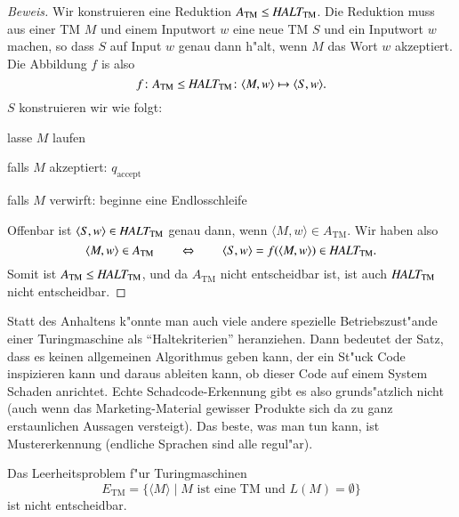\begin{proof}[Beweis]
Wir konstruieren eine Reduktion
$
A_{\text{TM}}
\le
\text{\it HALT}_{\text{TM}}
$.
Die Reduktion muss aus einer TM $M$ und einem Inputwort $w$ eine
neue TM $S$ und ein Inputwort $w$ machen, so dass $S$ auf
Input $w$ genau dann h"alt, wenn $M$ das Wort $w$ akzeptiert. Die Abbildung
$f$ is also
\[
f\colon 
A_{\text{TM}}
\le
\text{\it HALT}_{\text{TM}}
\colon
\langle M,w\rangle\mapsto \langle S,w\rangle.
\]
$S$ konstruieren wir wie folgt:
\medskip
\begin{compactenum}
\item lasse $M$ laufen
\item falls $M$ akzeptiert: $q_{\text{accept}}$
\item falls $M$ verwirft: beginne eine Endlosschleife
\end{compactenum}
\medskip
Offenbar ist
$\langle S,w\rangle\in \text{\it HALT}_{\text{TM}}$
genau dann, wenn $\langle M,w\rangle\in A_{\text{TM}}$.
Wir haben also
\[
\langle M,w\rangle\in A_{\text{TM}}
\qquad
\Leftrightarrow
\qquad
\langle S,w\rangle=f(\langle M,w\rangle)
\in \text{\it HALT}_{\text{TM}}.
\]
Somit ist 
$A_{\text{TM}}\le\text{\it HALT}_{\text{TM}}$, und da
$A_{\text{TM}}$ nicht entscheidbar ist, ist auch
$\text{\it HALT}_{\text{TM}}$ nicht entscheidbar.
\end{proof}
Statt des Anhaltens k"onnte man auch viele andere spezielle
Betriebszust"ande einer Turingmaschine als ``Haltekriterien''
heranziehen. Dann bedeutet der Satz, dass es keinen allgemeinen
Algorithmus geben kann, der ein St"uck Code inspizieren kann und
daraus ableiten kann, ob dieser Code auf einem System Schaden
anrichtet. Echte Schadcode-Erkennung gibt es also grunds"atzlich
nicht (auch wenn das Marketing-Material gewisser Produkte sich
da zu ganz erstaunlichen Aussagen versteigt). Das beste, was man
tun kann, ist Mustererkennung (endliche Sprachen sind alle regul"ar).

\begin{satz}
Das Leerheitsproblem f"ur Turingmaschinen
\[
E_{\text{TM}}
=
\{ \langle M\rangle\;|\; \text{$M$ ist eine TM und $L(M)=\emptyset$}\}
\]
ist nicht entscheidbar.
\end{satz}

